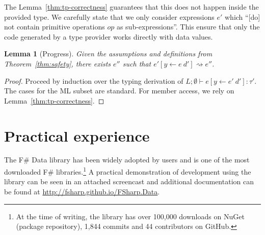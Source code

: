 \documentclass[10pt]{sigplanconf}
\newcommand{\reduce}{\rightsquigarrow}
\newtheorem{lemma}[theorem]{Lemma}
\begin{document}
The Lemma~\ref{thm:tp-correctness} guarantees that this does not happen inside the provided type.
We carefully state that we only consider expressions $e'$ which 
``[do] not contain primitive operations $op$ as sub-expressions''. This ensure that only
the code generated by a type provider works directly with data values.

\begin{lemma}[Progress]
\label{thm:rs-progress}
Given the assumptions and definitions from Theorem~\ref{thm:safety}, there exists $e''$ such that
$e'[y\leftarrow e~d'] \reduce e''$.
\end{lemma}
\begin{proof}
Proceed by induction over the typing derivation of $L; \emptyset \vdash e[y\leftarrow e'~d'] : \tau'$. 
The cases for the ML subset are standard. For member access, we rely on Lemma~\ref{thm:tp-correctness}.
\end{proof}



%
%

\section{Practical experience}
\label{sec:impl}

The F\# Data library has been widely adopted by users and is one of the most downloaded
F\# libraries.\footnote{At the time of writing, the library has over 100,000 downloads on NuGet 
(package repository), 1,844 commits and 44 contributors on GitHub.} A practical demonstration of 
development using the library can be seen in an attached screencast and additional documentation can be
found at \url{http://fsharp.github.io/FSharp.Data}.
\end{document}
